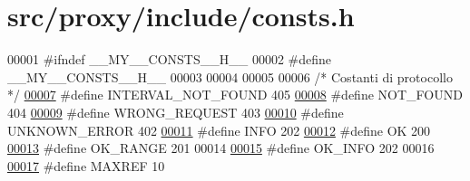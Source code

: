 \hypertarget{proxy_2include_2consts_8h_source}{
\section{src/proxy/include/consts.h}
}

\begin{DoxyCode}
00001 \textcolor{preprocessor}{#ifndef \_\_MY\_\_CONSTS\_\_H\_\_}
00002 \textcolor{preprocessor}{}\textcolor{preprocessor}{#define \_\_MY\_\_CONSTS\_\_H\_\_}
00003 \textcolor{preprocessor}{}
00004 
00005 
00006 \textcolor{comment}{/*      Costanti di protocollo  */}
\hypertarget{proxy_2include_2consts_8h_source_l00007}{}\hyperlink{proxy_2include_2consts_8h_a66095fa052d292be7cd4bf1b99934ef6}{00007} \textcolor{preprocessor}{#define INTERVAL\_NOT\_FOUND              405}
\hypertarget{proxy_2include_2consts_8h_source_l00008}{}\hyperlink{proxy_2include_2consts_8h_a33bfc1f995233887a0414369c36936b8}{00008} \textcolor{preprocessor}{}\textcolor{preprocessor}{#define NOT\_FOUND                               404}
\hypertarget{proxy_2include_2consts_8h_source_l00009}{}\hyperlink{proxy_2include_2consts_8h_a9b728358e3a34fd5d92e7cf02be1afb3}{00009} \textcolor{preprocessor}{}\textcolor{preprocessor}{#define WRONG\_REQUEST                   403}
\hypertarget{proxy_2include_2consts_8h_source_l00010}{}\hyperlink{proxy_2include_2consts_8h_a13b7b9ceea0c8133053f90fef1dd7cd7}{00010} \textcolor{preprocessor}{}\textcolor{preprocessor}{#define UNKNOWN\_ERROR                   402}
\hypertarget{proxy_2include_2consts_8h_source_l00011}{}\hyperlink{proxy_2include_2consts_8h_ae1103fea1e1b3c41ca3322d5389f7162}{00011} \textcolor{preprocessor}{}\textcolor{preprocessor}{#define INFO                                    202}
\hypertarget{proxy_2include_2consts_8h_source_l00012}{}\hyperlink{proxy_2include_2consts_8h_aba51915c87d64af47fb1cc59348961c9}{00012} \textcolor{preprocessor}{}\textcolor{preprocessor}{#define OK                                              200}
\hypertarget{proxy_2include_2consts_8h_source_l00013}{}\hyperlink{proxy_2include_2consts_8h_acb181c4edd2db90e071009848fa859b6}{00013} \textcolor{preprocessor}{}\textcolor{preprocessor}{#define OK\_RANGE                                201}
00014 \textcolor{preprocessor}{}
\hypertarget{proxy_2include_2consts_8h_source_l00015}{}\hyperlink{proxy_2include_2consts_8h_a31eb86199c8ce8fa36013a5646e29e37}{00015} \textcolor{preprocessor}{#define OK\_INFO                                 202}
00016 \textcolor{preprocessor}{}
\hypertarget{proxy_2include_2consts_8h_source_l00017}{}\hyperlink{proxy_2include_2consts_8h_a93490f19b31aee2379f0acc0aa08af06}{00017} \textcolor{preprocessor}{#define MAXREF                                  10}

\end{DoxyCode}
